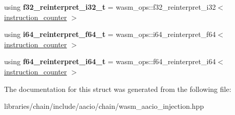 \begin{DoxyCompactItemize}
using {\bfseries f32\+\_\+reinterpret\+\_\+i32\+\_\+t} = wasm\+\_\+ops\+::f32\+\_\+reinterpret\+\_\+i32$<$ \mbox{\hyperlink{structaacio_1_1chain_1_1wasm__injections_1_1instruction__counter}{instruction\+\_\+counter}} $>$
\item 
\mbox{\label{structaacio_1_1chain_1_1wasm__injections_1_1pre__op__injectors_af95c11da39978d6fd126d758073ccb52}} 
using {\bfseries i64\+\_\+reinterpret\+\_\+f64\+\_\+t} = wasm\+\_\+ops\+::i64\+\_\+reinterpret\+\_\+f64$<$ \mbox{\hyperlink{structaacio_1_1chain_1_1wasm__injections_1_1instruction__counter}{instruction\+\_\+counter}} $>$
\item 
\mbox{\label{structaacio_1_1chain_1_1wasm__injections_1_1pre__op__injectors_a40c2c6b26d7bbf98a4326fd41086bcb7}} 
using {\bfseries f64\+\_\+reinterpret\+\_\+i64\+\_\+t} = wasm\+\_\+ops\+::f64\+\_\+reinterpret\+\_\+i64$<$ \mbox{\hyperlink{structaacio_1_1chain_1_1wasm__injections_1_1instruction__counter}{instruction\+\_\+counter}} $>$
\end{DoxyCompactItemize}


The documentation for this struct was generated from the following file\+:\begin{DoxyCompactItemize}
\item 
libraries/chain/include/aacio/chain/wasm\+\_\+aacio\+\_\+injection.\+hpp\end{DoxyCompactItemize}
